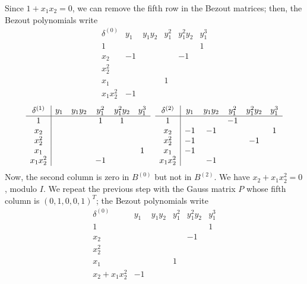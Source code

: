 \documentclass{standalone}
\begin{document}
Since $1 + x_1x_2 = 0$, we can remove the fifth row in the Bezout matrices; then, the Bezout polynomials write
$$
\begin{array}{c|ccccc}
	\delta^{(0)} & y_1 & y_1y_2 & y_1^2 & y_1^2y_2 & y_1^3 \\
	\hline
	1  &  &  &  &  & 1 \\
	x_2  & -1 &  &  & -1 & \\
	x_2^2  &  &  &  &  & \\
	x_1  &  &  & 1 &  & \\
	x_1x_2^2  & -1 &  &  &  &
\end{array}$$
$$
\begin{array}{c|ccccc}
	\delta^{(1)}  & y_1 & y_1y_2 & y_1^2 & y_1^2y_2 & y_1^3 \\
	\hline
	1  &  &  & 1 & 1 & \\
	x_2  &  &  &  &  & \\
	x_2^2  &  &  &  &  & \\
	x_1  &  &  &  &  & 1 \\
	x_1x_2^2  &  &  & -1 &  &
\end{array}
\hspace{0.2cm}
\begin{array}{c|ccccc}
	\delta^{(2)} & y_1 & y_1y_2 & y_1^2 & y_1^2y_2 & y_1^3 \\
	\hline
	1  &  &  & -1 &  & \\
	x_2  & -1 & -1 &  &  & 1 \\
	x_2^2  & -1 &  &  & -1 & \\
	x_1  & -1 &  &  &  & \\
	x_1x_2^2 &  & -1 &  &  &
\end{array}
$$
Now, the second column is zero in $B^{(0)}$ but not in $B^{(2)}$. We have $x_2 + x_1x_2^{2} = 0$, modulo $I$. We repeat the previous step with the Gauss matrix $P$ whose fifth column is $(0, 1, 0, 0, 1)^{T}$; the Bezout polynomials write
$$
\begin{array}{c|ccccc}
	\delta^{(0)} & y_1 & y_1y_2 & y_1^2 & y_1^2y_2 & y_1^3 \\
	\hline
	1  &  &  &  &  & 1 \\
	x_2  &  &  &  & -1 & \\
	x_2^2  &  &  &  &  & \\
	x_1  &  &  & 1 &  & \\
	x_2 + x_1x_2^2  & -1 &  &  &  &
\end{array}$$
\end{document}
